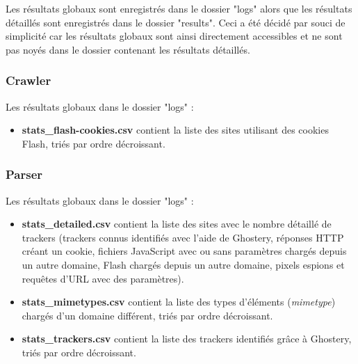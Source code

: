 Les résultats globaux sont enregistrés dans le dossier "logs" alors que les résultats détaillés sont enregistrés dans le dossier "results".
Ceci a été décidé par souci de simplicité car les résultats globaux sont ainsi directement accessibles et ne sont pas noyés dans le dossier contenant les résultats détaillés.

\subsubsection{Crawler}
Les résultats globaux dans le dossier "logs" :
\begin{itemize}
	\item \textbf{stats\_flash-cookies.csv} contient la liste des sites utilisant des cookies Flash, triés par ordre décroissant.
\end{itemize}

\subsubsection{Parser}
Les résultats globaux dans le dossier "logs" :
\begin{itemize}
	\item \textbf{stats\_detailed.csv} contient la liste des sites avec le nombre détaillé de trackers (trackers connus identifiés avec l'aide de Ghostery, réponses HTTP créant un cookie, fichiers JavaScript avec ou sans paramètres chargés depuis un autre domaine, Flash chargés depuis un autre domaine, pixels espions et requêtes d'URL avec des paramètres).
	\item \textbf{stats\_mimetypes.csv} contient la liste des types d'éléments (\textit{mimetype}) chargés d'un domaine différent, triés par ordre décroissant.
	\item \textbf{stats\_trackers.csv} contient la liste des trackers identifiés grâce à Ghostery, triés par ordre décroissant.
	\newline
\end{itemize}

